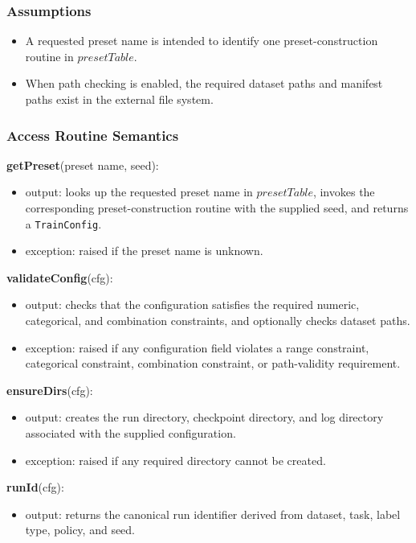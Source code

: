 \documentclass[12pt, titlepage]{article}
\begin{document}
\subsubsection{Assumptions}

\begin{itemize}
    \item A requested preset name is intended to identify one preset-construction routine in $presetTable$.
    \item When path checking is enabled, the required dataset paths and manifest paths exist in the external file system.
\end{itemize}

\subsubsection{Access Routine Semantics}

\noindent \textbf{getPreset}(preset name, seed):
\begin{itemize}
    \item output: looks up the requested preset name in $presetTable$, invokes the corresponding preset-construction routine with the supplied seed, and returns a \texttt{TrainConfig}.
    \item exception: raised if the preset name is unknown.
\end{itemize}

\noindent \textbf{validateConfig}(cfg):
\begin{itemize}
    \item output: checks that the configuration satisfies the required numeric, categorical, and combination constraints, and optionally checks dataset paths.
    \item exception: raised if any configuration field violates a range
    constraint, categorical constraint, combination constraint, or path-validity requirement.
\end{itemize}

\noindent \textbf{ensureDirs}(cfg):
\begin{itemize}
    \item output: creates the run directory, checkpoint directory, and log
    directory associated with the supplied configuration.
    \item exception: raised if any required directory cannot be created.
\end{itemize}

\noindent \textbf{runId}(cfg):
\begin{itemize}
    \item output: returns the canonical run identifier derived from dataset, task, label type, policy, and seed.
\end{itemize}
\end{document}
